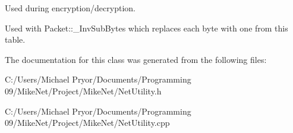 Used during encryption/decryption. 

Used with Packet::\_\-InvSubBytes which replaces each byte with one from this table. 

The documentation for this class was generated from the following files:\begin{DoxyCompactItemize}
\item 
C:/Users/Michael Pryor/Documents/Programming 09/MikeNet/Project/MikeNet/NetUtility.h\item 
C:/Users/Michael Pryor/Documents/Programming 09/MikeNet/Project/MikeNet/NetUtility.cpp\end{DoxyCompactItemize}
